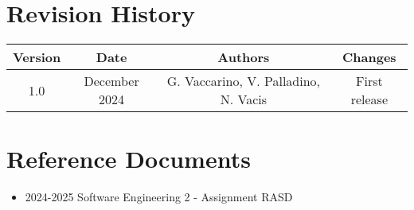 \section{Revision History}

\begin{tabular}{|c|c|c|c|}
    \hline
    Version & Date & Authors & Changes \\
    \hline
    1.0 & December 2024 & G. Vaccarino, V. Palladino, N. Vacis & First release \\
    \hline
\end{tabular}

\vspace{7mm}


\section{Reference Documents}
\begin{itemize}
    \item 2024-2025 Software Engineering 2 - Assignment RASD
\end{itemize}

\vspace{20mm}

